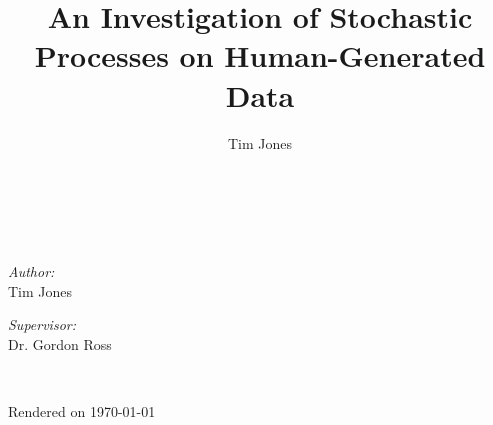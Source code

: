 \begin{titlepage}
\title{An Investigation of Stochastic Processes on Human-Generated Data}
\author{Tim Jones}

\\[1.5cm]

\\[1.5cm]

\begin{minipage}{0.4\textwidth}
\begin{flushleft} \large
\emph{Author:}\\
Tim Jones
\end{flushleft}
\end{minipage}
\begin{minipage}{0.4\textwidth}
\begin{flushright} \large
\emph{Supervisor:} \\
Dr. Gordon Ross
\end{flushright}
\end{minipage}\\[1.5cm]

\vfill

Rendered on \today

\end{titlepage}